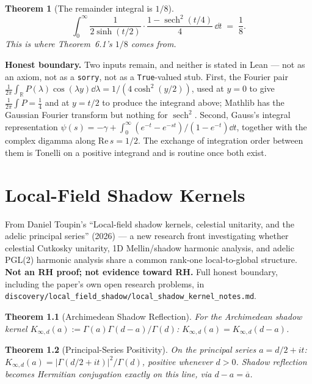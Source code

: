 \documentclass{report}
\newtheorem{theorem}{Theorem}[chapter]
\theoremstyle{definition}
\begin{document}
\begin{theorem}[The remainder integral is $1/8$]
  \label{thm:fm-remainder}
  \leanok
  \[
    \int_0^\infty \frac{1}{2\sinh(t/2)}\cdot
    \frac{1-\operatorname{sech}^2(t/4)}{4}\,\dd t \;=\; \frac18 .
  \]
  This is where Theorem~6.1's $1/8$ comes from.
\end{theorem}

\textbf{Honest boundary.} Two inputs remain, and neither is stated in Lean --- not as an
axiom, not as a \texttt{sorry}, not as a \texttt{True}-valued stub. First, the Fourier pair
$\frac{1}{2\pi}\int_{\mathbb{R}} P(\lambda)\cos(\lambda y)\dd\lambda
= 1/(4\cosh^2(y/2))$, used at $y=0$ to give $\frac{1}{2\pi}\int P=\frac14$ and at $y=t/2$ to
produce the integrand above; Mathlib has the Gaussian Fourier transform but nothing for
$\operatorname{sech}^2$. Second, Gauss's integral representation
$\psi(s)=-\gamma+\int_0^\infty (e^{-t}-e^{-st})/(1-e^{-t})\dd t$, together with the complex
digamma along $\mathrm{Re}\,s=1/2$. The exchange of integration order between them is
Tonelli on a positive integrand and is routine once both exist.

\chapter{Local-Field Shadow Kernels}

From Daniel Toupin's ``Local-field shadow kernels, celestial unitarity, and the adelic
principal series'' (2026) --- a new research front investigating whether celestial Cutkosky
unitarity, 1D Mellin/shadow harmonic analysis, and adelic PGL(2) harmonic analysis share a
common rank-one local-to-global structure. \textbf{Not an RH proof; not evidence toward RH.}
Full honest boundary, including the paper's own open research problems, in
\texttt{discovery/local\_field\_shadow/local\_shadow\_kernel\_notes.md}.

\begin{theorem}[Archimedean Shadow Reflection]
  \label{thm:arch-kernel-reflection}
  \leanok
  For the Archimedean shadow kernel $K_{\infty,d}(a) := \Gamma(a)\Gamma(d-a)/\Gamma(d)$:
  $K_{\infty,d}(a) = K_{\infty,d}(d-a)$.
\end{theorem}

\begin{theorem}[Principal-Series Positivity]
  \label{thm:arch-kernel-positivity}
  \leanok
  On the principal series $a=d/2+it$: $K_{\infty,d}(a) = |\Gamma(d/2+it)|^2/\Gamma(d)$,
  positive whenever $d>0$. Shadow reflection becomes Hermitian conjugation exactly on this
  line, via $d-a=\overline{a}$.
\end{theorem}
\end{document}
